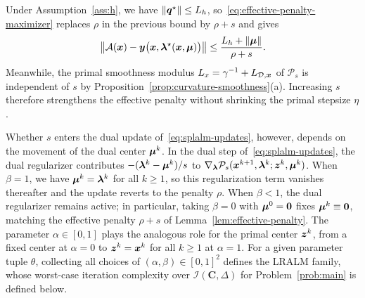 Under Assumption~\ref{ass:h}, we have \(\|\bm{q}^\star\|\le L_h\),
so~\eqref{eq:effective-penalty-maximizer} replaces \(\rho\) in the previous
bound by \(\rho+s\) and gives
\[
    \bigl\|\mathcal{A}(\bm{x})-\bm{y}\bigl(\bm{x},\bm{\lambda}^\star(\bm{x},\bm{\mu})\bigr)\bigr\|
    \le\frac{L_h+\|\bm{\mu}\|}{\rho+s}.
\]
Meanwhile, the primal smoothness modulus \(L_x=\gamma^{-1}+L_{\mathcal{D},\bm{x}}\)
of \(\mathcal P_s\) is independent of \(s\) by
Proposition~\ref{prop:curvature-smoothness}(a). Increasing \(s\) therefore
strengthens the effective penalty without shrinking the primal stepsize
\(\eta\).

Whether \(s\) enters the dual update of~\eqref{eq:splalm-updates}, however, depends
on the movement of the dual center \(\bm{\mu}^k\). In the dual step
of~\eqref{eq:splalm-updates}, the dual regularizer contributes
\(-(\bm{\lambda}^k-\bm{\mu}^k)/s\) to
\(\nabla_{\bm{\lambda}}\mathcal P_s(\bm{x}^{k+1},\bm{\lambda}^k;\bm{z}^k,\bm{\mu}^k)\). When
\(\beta=1\), we have \(\bm{\mu}^k=\bm{\lambda}^k\) for all \(k\ge1\), so this
regularization term vanishes thereafter and the update reverts to the penalty
\(\rho\). When \(\beta<1\), the dual regularizer remains active; in particular,
taking \(\beta=0\) with \(\bm{\mu}^0=\bm{0}\) fixes \(\bm{\mu}^k\equiv\bm{0}\), matching
the effective penalty \(\rho+s\) of Lemma~\ref{lem:effective-penalty}. The
parameter \(\alpha\in[0,1]\) plays the analogous role for the primal center
\(\bm{z}^k\), from a fixed center at \(\alpha=0\) to \(\bm{z}^k=\bm{x}^k\) for all
\(k\ge1\) at \(\alpha=1\). For a given
parameter tuple \(\theta\), collecting all choices of
\((\alpha,\beta)\in[0,1]^2\) defines the LRALM family, whose worst-case
iteration complexity over
\(\mathcal I(\mathbf C,\Delta)\)
for Problem~\eqref{prob:main} is defined below.

